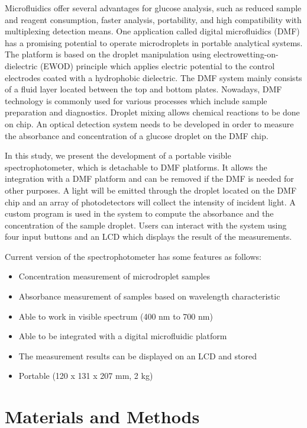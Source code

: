 \documentclass[conference]{IEEEtran}
\begin{document}
Microfluidics offer several advantages for glucose analysis, such as reduced sample and reagent consumption, faster analysis, portability, and high compatibility with multiplexing detection means\cite{b3,b4}.
One application called digital microfluidics (DMF) has a promising potential to operate microdroplets in portable analytical systems.
The platform is based on the droplet manipulation using electrowetting-on-dielectric (EWOD) principle which applies electric potential to the control electrodes coated with a hydrophobic dielectric\cite{b3}.
The DMF system mainly consists of a fluid layer located between the top and bottom plates. Nowadays, DMF technology is commonly used for various processes which include sample preparation and diagnostics\cite{b5}.
Droplet mixing allows chemical reactions to be done on chip. An optical detection system needs to be developed in order to measure the absorbance and concentration of a glucose droplet on the DMF chip. 

In this study, we present the development of a portable visible spectrophotometer, which is detachable to DMF platforms.
It allows the integration with a DMF platform and can be removed if the DMF is needed for other purposes.
A light will be emitted through the droplet located on the DMF chip and an array of photodetectors will collect the intensity of incident light.
A custom program is used in the system to compute the absorbance and the concentration of the sample droplet.
Users can interact with the system using four input buttons and an LCD which displays the result of the measurements. 

Current version of the spectrophotometer has some features as follows:
\begin{itemize}
    \item Concentration measurement of microdroplet samples 
    \item Absorbance measurement of samples based on wavelength characteristic 
    \item Able to work in visible spectrum (400 nm to 700 nm) 
    \item Able to be integrated with a digital microfluidic platform 
    \item The measurement results can be displayed on an LCD and stored 
    \item Portable (120 x 131 x 207 mm, 2 kg)
\end{itemize}

\section{Materials and Methods}
\end{document}
